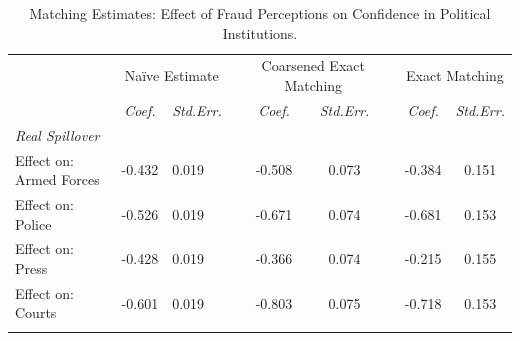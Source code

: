 \documentclass[11pt, ngerman,english,a4]{article}
\begin{document}
\begin{table}[]
	\caption{Matching Estimates: Effect of Fraud Perceptions on Confidence in Political Institutions.}
	\singlespace
	\begin{tabular}{llllccccc}
		\hline
		& \multicolumn{2}{c}{Na{\"i}ve Estimate}                                         & \multicolumn{1}{c}{}          & \multicolumn{2}{c}{Coarsened Exact Matching} &                      & \multicolumn{2}{c}{Exact Matching}          \\
		                              & \multicolumn{1}{c}{\textit{Coef.}} & \multicolumn{1}{c}{\textit{Std.Err.}} & \multicolumn{1}{c}{\textit{}} & \textit{Coef.}       & \textit{Std.Err.}    & \textit{}            & \textit{Coef.}       & \textit{Std.Err.}    \\ \cline{2-3} \cline{5-6} \cline{8-9} 
		\textit{Real Spillover}       &                                    &                                       &                               & \multicolumn{1}{l}{} & \multicolumn{1}{l}{} & \multicolumn{1}{l}{} & \multicolumn{1}{l}{} & \multicolumn{1}{l}{} \\
		Effect on: Armed Forces       & -0.432                             & 0.019                                 &                               & -0.508               & 0.073                &                      & -0.384               & 0.151                \\
		Effect on: Police             & -0.526                             & 0.019                                 &                               & -0.671               & 0.074                &                      & -0.681               & 0.153                \\
		Effect on: Press              & -0.428                             & 0.019                                 &                               & -0.366               & 0.074                &                      & -0.215               & 0.155                \\
		Effect on: Courts             & -0.601                             & 0.019                                 &                               & -0.803               & 0.075                &                      & -0.718               & 0.153                \\
		                              &                                    &                                       &                               &                      &                      &                      &                      &                      \\

\end{tabular}
\end{table}
\end{document}
